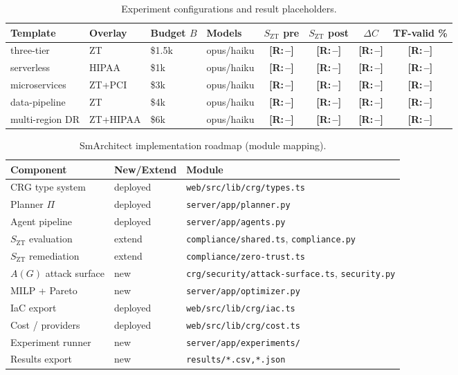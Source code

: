\documentclass[journal]{IEEEtran}
\newif\ifdraft\drafttrue   %
\newcommand{\result}[1]{\ifdraft\textcolor{resultblue}{\textbf{[R:\,#1]}}\else#1\fi}
\theoremstyle{plain}
\theoremstyle{definition}
\newcommand{\G}{G}
\newcommand{\Szt}{S_{\mathrm{ZT}}}
\newcommand{\code}[1]{\texttt{\small #1}}
\begin{document}
\begin{table}[t]
\caption{Experiment configurations and result placeholders.}
\label{tab:exp}
\centering\footnotesize
\begin{tabular}{@{}llllcccc@{}}
\toprule
Template & Overlay & Budget $B$ & Models & $\Szt$ pre & $\Szt$ post & $\Delta C$ & TF-valid \%\\
\midrule
three-tier & ZT & \$1.5k & opus/haiku & \result{--} & \result{--} & \result{--} & \result{--}\\
serverless & HIPAA & \$1k & opus/haiku & \result{--} & \result{--} & \result{--} & \result{--}\\
microservices & ZT+PCI & \$3k & opus/haiku & \result{--} & \result{--} & \result{--} & \result{--}\\
data-pipeline & ZT & \$4k & opus/haiku & \result{--} & \result{--} & \result{--} & \result{--}\\
multi-region DR & ZT+HIPAA & \$6k & opus/haiku & \result{--} & \result{--} & \result{--} & \result{--}\\
\bottomrule
\end{tabular}
\end{table}

\begin{table}[t]
\caption{SmArchitect implementation roadmap (module mapping).}
\label{tab:roadmap}
\centering\footnotesize
\begin{tabular}{@{}lll@{}}
\toprule
Component & New/Extend & Module\\
\midrule
CRG type system & deployed & \code{web/src/lib/crg/types.ts}\\
Planner $\Pi$ & deployed & \code{server/app/planner.py}\\
Agent pipeline & deployed & \code{server/app/agents.py}\\
$\Szt$ evaluation & extend & \code{compliance/shared.ts}, \code{compliance.py}\\
$\Szt$ remediation & extend & \code{compliance/zero-trust.ts}\\
$A(\G)$ attack surface & new & \code{crg/security/attack-surface.ts}, \code{security.py}\\
MILP + Pareto & new & \code{server/app/optimizer.py}\\
IaC export & deployed & \code{web/src/lib/crg/iac.ts}\\
Cost / providers & deployed & \code{web/src/lib/crg/cost.ts}\\
Experiment runner & new & \code{server/app/experiments/}\\
Results export & new & \code{results/*.csv,*.json}\\
\bottomrule
\end{tabular}
\end{table}
\end{document}

